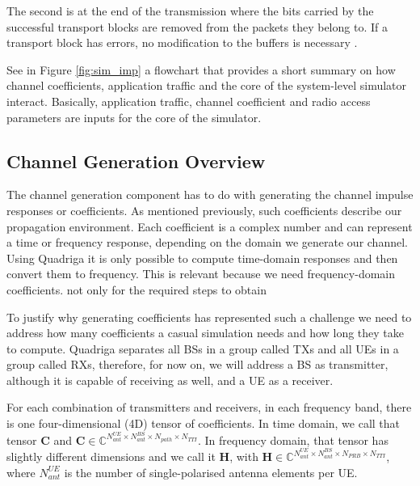The second is at the end of the transmission where the bits carried by the successful transport blocks are removed from the packets they belong to. If a transport block has errors, no modification to the buffers is necessary .

See in Figure \ref{fig:sim_imp} a flowchart that provides a short summary on how channel coefficients, application traffic and the core of the system-level simulator interact. Basically, application traffic, channel coefficient and radio access parameters are inputs for the core of the simulator.



\subsection*{Channel Generation Overview}

The channel generation component has to do with generating the channel impulse responses or coefficients. As mentioned previously, such coefficients describe our propagation environment. Each coefficient is a complex number and can represent a time or frequency response, depending on the domain we generate our channel. Using Quadriga it is only possible to compute time-domain responses and then convert them to frequency. This is relevant because we need frequency-domain coefficients. not only for the required steps to obtain 

To justify why generating coefficients has represented such a challenge we need to address how many coefficients a casual simulation needs and how long they take to compute. Quadriga separates all \acsp{BS} in a group called \acp{TX} and all \acsp{UE} in a group called \acp{RX}, therefore, for now on, we will address a BS as transmitter, although it is capable of receiving as well, and a UE as a receiver.

For each combination of transmitters and receivers, in each frequency band, there is one four-dimensional (4D) tensor of coefficients. In time domain, we call that tensor $\bm{C}$ and $\bm{C} \in \mathbb{C}^{N_{ant}^{UE} \times N_{ant}^{BS} \times N_{path} \times N_{TTI}}$. In frequency domain, that tensor has slightly different dimensions and we call it $\bm{H}$, with $\bm{H} \in \mathbb{C}^{N_{ant}^{UE} \times N_{ant}^{BS} \times N_{PRB} \times N_{TTI}}$, where $N_{ant}^{UE}$ is the number of single-polarised antenna elements per UE.

